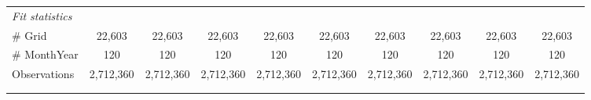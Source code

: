 \begin{table}[htbp]
\begin{tabular}{lccccccccc}
      \midrule
      \emph{Fit statistics}\\
      \# Grid                         & 22,603        & 22,603        & 22,603        & 22,603        & 22,603        & 22,603        & 22,603        & 22,603        & 22,603\\  
      \# MonthYear                    & 120           & 120           & 120           & 120           & 120           & 120           & 120           & 120           & 120\\  
      Observations                    & 2,712,360     & 2,712,360     & 2,712,360     & 2,712,360     & 2,712,360     & 2,712,360     & 2,712,360     & 2,712,360     & 2,712,360\\  
      \midrule \midrule
                                      &               &               &               &               &               &               &               &               &  \tabularnewline 
      \\
   \end{tabular}
\end{table}


